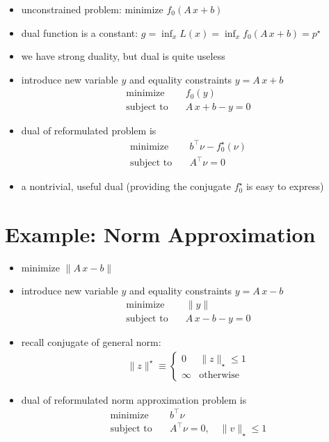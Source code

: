 \documentclass[11pt]{extarticle}
\newcommand{\ds}{\displaystyle}
\theoremstyle{definition}
\begin{document}
\begin{itemize}\setlength\itemsep{0em}
  \item unconstrained problem: $\ds\text{minimize }f_0(A\,x + b)$ 
  \item dual function is a constant: $\ds g = \inf_x L(x) = \inf_x f_0(A\,x + b) = p^\star$
  \item we have strong duality, but dual is quite useless
  \item introduce new variable $y$ and equality constraints $\ds y = A\,x + b$
    \begin{align*}
      \text{minimize}\quad & f_0(y) \\
      \text{subject to}\quad & A\,x + b - y = 0
    \end{align*}
  \item dual of reformulated problem is 
    \begin{align*}
      \text{minimize}\quad & b^\top\nu - f_0^\star(\nu) \\
      \text{subject to}\quad & A^\top\nu = 0
    \end{align*}
  \item a nontrivial, useful dual (providing the conjugate $f_0^\star$ is easy to express)
\end{itemize}

\newpage

\section*{Example: Norm Approximation}

\begin{itemize}
  \item $\ds\text{minimize }\|A\,x - b\|$ 
  \item introduce new variable $y$ and equality constraints $\ds y = A\,x - b$
    \begin{align*}
      \text{minimize}\quad & \|y\| \\
      \text{subject to}\quad & A\,x - b - y = 0
    \end{align*}
  \item recall conjugate of general norm:
    \begin{align*}
      \|z\|^\star\equiv\begin{cases} 0 & \|z\|_\star \leqslant 1 \\ \infty & \text{otherwise} \end{cases}
    \end{align*}
  \item dual of reformulated norm approximation problem is 
    \begin{align*}
      \text{minimize}\quad & b^\top\nu \\
      \text{subject to}\quad & A^\top\nu = 0, \quad \|v\|_\star\leqslant 1
    \end{align*}
\end{itemize}
\end{document}

